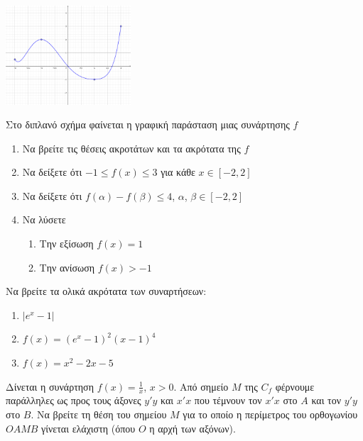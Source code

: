 \documentclass{presentation}
\begin{document}
\begin{askisi}
  \centering
  \includegraphics[width=0.35\textwidth]{"images/1.3.2 Μονοτονία.png"}

  Στο διπλανό σχήμα φαίνεται η γραφική παράσταση μιας συνάρτησης $f$
  \begin{enumerate}
    \item Να βρείτε τις θέσεις ακροτάτων και τα ακρότατα της $f$\pause
    \item Να δείξετε ότι $-1\le f(x) \le 3$ για κάθε $x\in[-2,2]$\pause
    \item Να δείξετε ότι $f(α)-f(β)\le 4$, $α$, $β\in[-2,2]$ \pause
    \item Να λύσετε
          \begin{enumerate}
            \item Την εξίσωση $f(x)=1$ \pause
            \item Την ανίσωση $f(x)>-1$
          \end{enumerate}
  \end{enumerate}

\end{askisi}

\begin{askisi}
  Να βρείτε τα ολικά ακρότατα των συναρτήσεων:
  \begin{enumerate}
    \item $|e^x-1|$ \pause
    \item $f(x)=(e^x-1)^2(x-1)^4$ \pause
    \item $f(x)=x^2-2x-5$
  \end{enumerate}

\end{askisi}

\begin{askisi}
  Δίνεται η συνάρτηση $f(x)=\frac{1}{x}$, $x>0$. Από σημείο $Μ$ της $C_f$ φέρνουμε παράλληλες ως προς τους άξονες $y'y$ και $x'x$ που τέμνουν τον $x'x$ στο $Α$ και τον $y'y$ στο $Β$. Να βρείτε τη θέση του σημείου $Μ$ για το οποίο η περίμετρος του ορθογωνίου $ΟΑΜΒ$ γίνεται ελάχιστη (όπου $Ο$ η αρχή των αξόνων).

\end{askisi}
\end{document}
